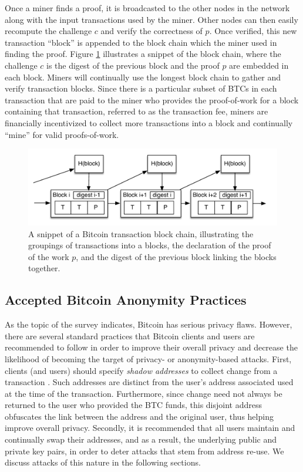 Once a miner finds a proof, it is broadcasted to the other nodes in the network along with the input transactions used by the miner. Other nodes can then easily recompute the challenge $c$ and verify the correctness of $p$. Once verified, this new transaction ``block'' is appended to the block chain which the miner used in finding the proof. Figure \ref{fig:block} illustrates a snippet of the block chain, where the challenge $c$ is the digest of the previous block and the proof $p$ are embedded in each block. Miners will continually use the longest block chain to gather and verify transaction blocks. Since there is a particular subset of BTCs in each transaction that are paid to the miner who provides the proof-of-work for a block containing that transaction, referred to as the transaction fee, miners are financially incentivized to collect more transactions into a block and continually ``mine'' for valid proofs-of-work. 

\begin{center}
\begin{figure}
\includegraphics[scale=0.5]{./images/transaction_block_pow.pdf}
\caption{A snippet of a Bitcoin transaction block chain, illustrating the groupings of transactions into a blocks, the declaration of the proof of the work $p$, and the digest of the previous block linking the blocks together.}
\label{fig:block}
\end{figure}
\end{center}

\subsection{Accepted Bitcoin Anonymity Practices}
As the topic of the survey indicates, Bitcoin has serious privacy flaws. However, there are several standard practices that Bitcoin clients and users are recommended to follow in order to improve their overall privacy and decrease the likelihood of becoming the target of privacy- or anonymity-based attacks. First, clients (and users) should specify \emph{shadow addresses} to collect change from a transaction \cite{bitcoin-shadow-addresses}. Such addresses are distinct from the user's address associated used at the time of the transaction. Furthermore, since change need not always be returned to the user who provided the BTC funds, this disjoint address obfuscates the link between the address and the original user, thus helping improve overall privacy. Secondly, it is recommended that all users maintain and continually swap their addresses, and as a result, the underlying public and private key pairs, in order to deter attacks that stem from address re-use. We discuss attacks of this nature in the following sections.

